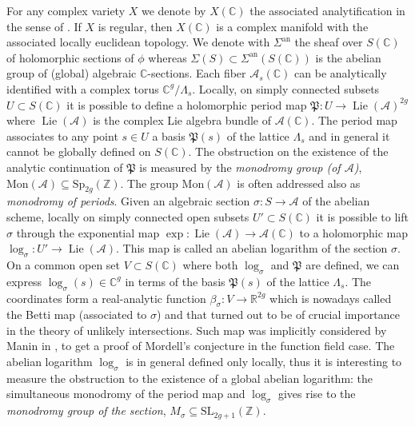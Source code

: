 \documentclass[10 pt,a4paper]{article}
\theoremstyle{plain}
\theoremstyle{definition}
\theoremstyle{named}
\newcommand{\cA}{\mathcal A}
\DeclareMathOperator{\an}{an}
\DeclareMathOperator{\Lie}{Lie}
\begin{document}
For any complex variety $X$ we denote by $X(\mathbb C)$ the associated analytification in the sense of \cite[Exposé XII]{SGA1}. If $X$ is regular, then $X(\mathbb C)$ is a complex manifold with the associated locally euclidean topology. We denote with $\Sigma^{\an}$ the sheaf over $S(\mathbb C)$ of holomorphic sections of $\phi$ whereas $\Sigma(S)\subset \Sigma^{\an}(S(\mathbb C))$ is the abelian group of (global) algebraic $\mathbb C$-sections. Each fiber $\mathcal A_s(\mathbb C)$ can be analytically identified with a complex torus $\mathbb C^g/\Lambda_s$. Locally, on simply connected subsets  $U\subset S(\mathbb C)$ it is possible to define a holomorphic period map $\mathfrak P: U\to\Lie(\cA)^{2g}$ where $\Lie(\cA)$ is the complex Lie algebra bundle of $\cA(\mathbb C)$. The period map associates to any point $s\in U$ a basis $\mathfrak P(s)$ of the lattice $\Lambda_s$ and in general it  cannot be globally defined on $S(\mathbb C)$. The obstruction on the existence of the analytic continuation of $\mathfrak P$   is measured by the \emph{monodromy group (of $\mathcal A$)}, $\textrm{Mon}(\mathcal A)\subseteq\text{Sp}_{2g}(\mathbb Z)$. The group $\textrm{Mon}(\mathcal A)$ is often addressed also as \emph{monodromy of periods}. Given an algebraic section $\sigma\colon S\to \cA$ of the abelian scheme,  locally on simply connected open subsets $U'\subset S(\mathbb C)$ it is possible to lift $\sigma$ through the exponential map $\exp\colon \Lie(\cA)\to \cA(\mathbb C)$ to a holomorphic map $\log_\sigma\colon U'\to \Lie(\cA)$. This map is called an abelian logarithm of the section $\sigma$. On a common open set $V\subset S(\mathbb C)$ where both $\log_\sigma$ and $\mathfrak P$ are defined, we can express $\log_\sigma(s)\in\mathbb C^{g}$ in terms of the basis $\mathfrak P(s)$ of the lattice $\Lambda_s$. The coordinates form a real-analytic function $\beta_\sigma\colon V\to\mathbb R^{2g}$ which is nowadays called the Betti map (associated to $\sigma$) and that turned out to be of crucial importance in the theory of unlikely intersections. Such map was implicitly considered by Manin in \cite{Man}, to get a proof of Mordell's conjecture in the function field case. The  abelian logarithm $\log_\sigma$ is in general defined only locally, thus it is interesting to measure the obstruction to the existence of a global abelian logarithm: the simultaneous monodromy of the period map and  $\log_\sigma$ gives rise to the \emph{monodromy group of the section}, $M_\sigma\subseteq\textrm{SL}_{2g+1}(\mathbb Z)$.\\
\end{document}
